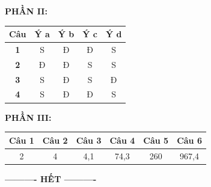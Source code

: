 \documentclass[12pt,a4paper]{article}
\begin{document}
\noindent\textbf{PHẦN II:}
\begin{center}
\begin{tabular}{|c|c|c|c|c|}
\hline
\textbf{Câu} & \textbf{Ý a} & \textbf{Ý b} & \textbf{Ý c} & \textbf{Ý d} \\ \hline
\textbf{1} & S & Đ & Đ & S \\ \hline
\textbf{2} & Đ & Đ & S & S \\ \hline
\textbf{3} & S & Đ & S & Đ \\ \hline
\textbf{4} & S & Đ & Đ & S \\ \hline
\end{tabular}
\end{center}

\noindent\textbf{PHẦN III:}
\begin{center}
\begin{tabular}{|c|c|c|c|c|c|}
\hline
\textbf{Câu 1} & \textbf{Câu 2} & \textbf{Câu 3} & \textbf{Câu 4} & \textbf{Câu 5} & \textbf{Câu 6} \\ \hline
2 & 4 & 4,1 & 74,3 & 260 & 967,4 \\ \hline
\end{tabular}
\end{center}

\begin{center}
	\textbf{---------- HẾT ----------}
\end{center}
\end{document}
